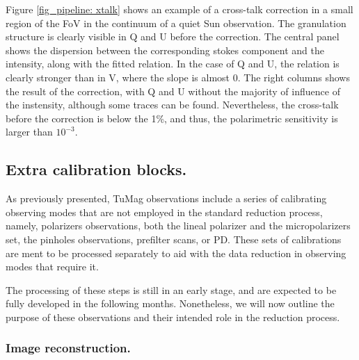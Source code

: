 Figure \ref{fig_pipeline: xtalk} shows an example of a cross-talk correction in a small region of the FoV in the continuum of a quiet Sun observation. The granulation structure is clearly visible in Q and U before the correction. The central panel shows the dispersion between the corresponding  stokes component and the intensity, along with the fitted relation. In the case of Q and U, the relation is clearly stronger than in V, where the slope is almost 0. The right columns shows the result of the correction, with Q and U without the majority of influence of the instensity, although some traces can be found. Nevertheless, the cross-talk before the correction is below the 1\%, and thus, the polarimetric sensitivity is larger than $10^{-3}$.
\subsection{Extra calibration blocks.}

As previously presented, TuMag observations include a series of calibrating observing modes that are not employed in the standard reduction process, namely, polarizers observations, both the lineal polarizer and the micropolarizers set, the pinholes observations, prefilter scans, or PD. These sets of calibrations are ment to be processed separately to aid with the data reduction in observing modes that require it.

The processing of these steps is still in an early stage, and are expected to be fully developed in the following months. Nonetheless, we will now outline the purpose of these observations and their intended role in the reduction process.
\subsubsection{Image reconstruction.}

